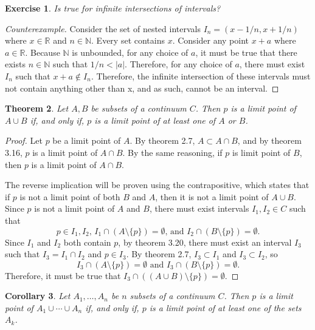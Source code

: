 \documentclass{amsart}
\newtheorem{theorem}{Theorem}
\newtheorem{corollary}[theorem]{Corollary}
\newtheorem{exercise}[theorem]{Exercise}
\newcommand{\N}{\mathbb N}
\newcommand{\R}{\mathbb R}
\newcommand{\1}{\mathds{1}}
\def \R {{\mathbb {R}}}
\def \N {{\mathbb {N}}}
\numberwithin{equation}{section}
\numberwithin{theorem}{section}
\begin{document}
\begin{exercise}
	Is  true for {\em infinite} intersections of intervals?
\end{exercise}

\begin{proof}[Counterexample]
	Consider the set of nested intervals $I_n = (x-1/n,x+1/n)$ where $x\in\R$ and $n\in\N$. Every set contains $x$. Consider any point $x+a$ where $a\in\R$. Because $\N$ is unbounded, for any choice of $a$, it must be true that there exists $n\in\N$ such that $1/n<|a|$. Therefore, for any choice of $a$, there must exist $I_n$ such that $x+a\notin I_n$. Therefore, the infinite intersection of these intervals must not contain anything other than x, and as such, cannot be an interval. 
\end{proof}

\begin{theorem}  Let $A, B$ be subsets of a continuum $C$.  Then $p$ is a limit point of $A \cup B$ if, and only if, $p$ is a limit point of at least one of $A$ or $B$.
\end{theorem}

\begin{proof}
	Let $p$ be a limit point of $A$. By theorem 2.7, $A\subset A\cap B$, and by theorem 3.16, $p$ is a limit point of $A\cap B$. By the same reasoning, if $p$ is limit point of $B$, then $p$ is a limit point of $A\cap B$. 
	
	The reverse implication will be proven using the contrapositive, which states that if $p$ is not a limit point of both $B$ and $A$, then it is not a limit point of $A\cup B$. Since $p$ is not a limit point of $A$ and $B$, there must exist intervals $I_1,I_2\in C$ such that $$p\in I_1,I_2 \text{, } I_1 \cap (A\setminus \{p\}) =\emptyset \text{, and } I_2 \cap (B\setminus \{p\}) =\emptyset.$$ Since $I_1$ and $I_2$ both contain $p$, by theorem 3.20, there must exist an interval $I_3$ such that $I_3 = I_1 \cap I_2$ and $p\in I_3$. By theorem 2.7, $I_3 \subset I_1$ and $I_3 \subset I_2$, so $$I_3 \cap (A\setminus \{p\}) =\emptyset \text{ and } I_3 \cap (B\setminus \{p\}) =\emptyset.$$ Therefore, it must be true that $I_3 \cap ((A\cup B)\setminus \{p\}) =\emptyset$.
\end{proof}
	
\begin{corollary}
	Let $A_1, \dotsc, A_n$ be $n$ subsets of a continuum $C$.  Then $p$ is a limit point of $A_1 \cup \dotsm \cup A_n$ if, and only if, $p$ is a limit point of at least one of the sets $A_k$.
\end{corollary}
\end{document}
